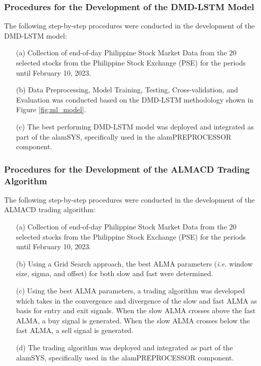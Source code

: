 \subsubsection{Procedures for the Development of the DMD-LSTM Model}
\label{subsubsec:proc_dmdlstm}
The following step-by-step procedures were conducted in the development
of the DMD-LSTM model:
\begin{itemize}
    \item[(a)] Collection of end-of-day Philippine Stock Market Data from the
    20 selected stocks from the Philippine Stock Exchange (PSE) for the periods
    until February 10, 2023.
    \item[(b)] Data Preprocessing, Model Training, Testing, Cross-validation, and Evaluation
    was conducted based on the DMD-LSTM methodology shown in Figure \ref{fig:ml_model}.
    \item[(c)] The best performing DMD-LSTM model was deployed and integrated as part 
    of the alamSYS, specifically used in the alamPREPROCESSOR component.
\end{itemize}

\subsubsection{Procedures for the Development of the ALMACD Trading Algorithm}
\label{subsubsec:proc_almacd}
The following step-by-step procedures were conducted in the development
of the ALMACD trading algorithm:
\begin{itemize}
    \item[(a)] Collection of end-of-day Philippine Stock Market Data from the
    20 selected stocks from the Philippine Stock Exchange (PSE) for the periods
    until February 10, 2023.
    \item[(b)] Using a Grid Search approach, the best ALMA parameters 
    (\textit{i.e.} window size, sigma, and offset) for both slow and fast were
    determined.
    \item[(c)] Using the best ALMA parameters, a trading algorithm was developed
    which takes in the convergence and divergence of the slow and fast ALMA as basis
    for entry and exit signals. When the slow ALMA crosses above the fast ALMA, a
    buy signal is generated. When the slow ALMA crosses below the fast ALMA, a sell
    signal is generated.
    \item[(d)] The trading algorithm was deployed and integrated as part of the
    alamSYS, specifically used in the alamPREPROCESSOR component.
\end{itemize}


